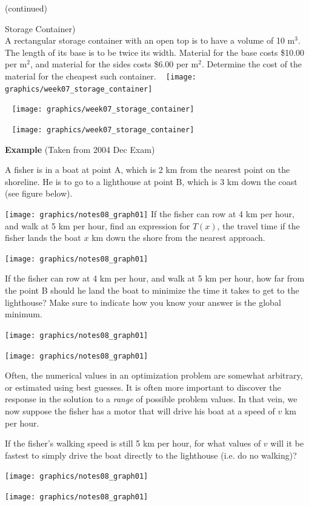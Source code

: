 \vspace{5cm}

\newpage

\hfill (continued)


\newpage

\problem Storage Container)\\ A rectangular storage container with an
  open top is to have a volume of 10 m$^3$.  The length of its base is
  to be twice its width.  Material for the base costs \$10.00 per
  m$^2$, and material for the sides costs \$6.00 per m$^2$.  Determine
  the cost of the material for the cheapest such container.
~ \hfill \texttt{[image: graphics/week07\_storage\_container]}

\newpage
~ \hfill \texttt{[image: graphics/week07\_storage\_container]}

\newpage
~ \hfill \texttt{[image: graphics/week07\_storage\_container]}

\newpage 

{\bf Example} (Taken from 2004 Dec Exam)

A fisher is in a boat at point A, which is 2 km from the nearest
point on the shoreline.  He is to go to a lighthouse at point B, which
is 3 km down the coast (see figure below).

\hfill \texttt{[image: graphics/notes08\_graph01]}
\newpage If the fisher can row at 4 km per hour, and walk
  at 5 km per hour, find an expression for $T(x)$, the travel time if
  the fisher lands the boat $x$ km down the shore from the nearest
  approach.

\hfill \texttt{[image: graphics/notes08\_graph01]}

\newpage 

If the fisher can row at 4 km per hour, and walk at 5 km
  per hour, how far from the point B should he land the boat to
  minimize the time it takes to get to the lighthouse?  Make sure to
  indicate how you know your answer is the global minimum.

\hfill \texttt{[image: graphics/notes08\_graph01]}
\vsc

\newpage

\hfill \texttt{[image: graphics/notes08\_graph01]}

\newpage


Often, the numerical values in an optimization problem are somewhat
arbitrary, or estimated using best guesses.  It is often more
important to discover the response in the solution to a {\em range} of
possible problem values.  In that vein, we now suppose the fisher
has a motor that will drive his boat at a speed of $v$ km per hour.

If the fisher's walking speed is still 5 km per hour,
  for what values of $v$ will it be fastest to simply drive the boat
  directly to the lighthouse (i.e. do no walking)?

\hfill \texttt{[image: graphics/notes08\_graph01]}

\newpage

\hfill \texttt{[image: graphics/notes08\_graph01]}






